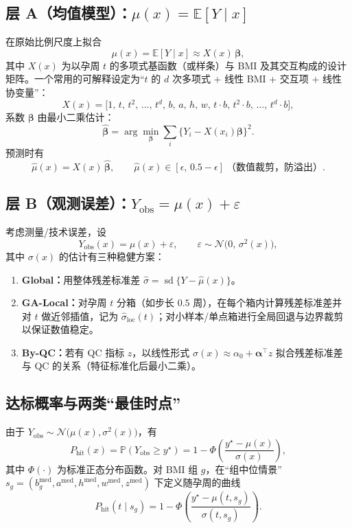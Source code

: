\documentclass[11pt,a4paper]{article}
\begin{document}
\subsection{层 A（均值模型）：$\mu(x)=\mathbb{E}[Y\mid x]$}
在原始比例尺度上拟合
\[
  \mu(x)=\mathbb{E}[Y\mid x]\approx X(x)\,\bm{\beta},
\]
其中 $X(x)$ 为以孕周 $t$ 的多项式基函数（或样条）与 BMI 及其交互构成的设计矩阵。一个常用的可解释设定为“$t$ 的 $d$ 次多项式 + 线性 BMI + 交互项 + 线性协变量”：
\[
  X(x)=\bigl[1,\, t,\, t^2,\,\dots,\,t^d,\, b,\, a,\, h,\, w,\, t\!\cdot\!b,\, t^2\!\cdot\!b,\,\dots,\,t^d\!\cdot\!b \bigr],
\]
系数 $\bm{\beta}$ 由最小二乘估计：
\[
  \widehat{\bm{\beta}}=\arg\min_{\bm{\beta}}\sum_i\bigl\{Y_i-X(x_i)\bm{\beta}\bigr\}^2.
\]
预测时有
\[
  \widehat{\mu}(x)=X(x)\,\widehat{\bm{\beta}},\qquad
  \widehat{\mu}(x)\in[\epsilon,\,0.5-\epsilon]\ \text{（数值裁剪，防溢出）}.
\]

\subsection{层 B（观测误差）：$Y_{\text{obs}}=\mu(x)+\varepsilon$}
考虑测量/技术误差，设
\[
  Y_{\text{obs}}(x)=\mu(x)+\varepsilon,\qquad
  \varepsilon\sim\mathcal{N}\bigl(0,\,\sigma^2(x)\bigr),
\]
其中 $\sigma(x)$ 的估计有三种稳健方案：
\begin{enumerate}
  \item \textbf{Global：}用整体残差标准差 $\hat\sigma=\operatorname{sd}\{Y-\widehat{\mu}(x)\}$。
  \item \textbf{GA-Local：}对孕周 $t$ 分箱（如步长 $0.5$ 周），在每个箱内计算残差标准差并对 $t$ 做近邻插值，记为 $\widehat{\sigma}_{\text{loc}}(t)$；对小样本/单点箱进行全局回退与边界裁剪以保证数值稳定。
  \item \textbf{By-QC：}若有 QC 指标 $z$，以线性形式
  \(
    \sigma(x)\approx \alpha_0+\bm{\alpha}^\top z
  \)
  拟合残差标准差与 QC 的关系（特征标准化后最小二乘）。
\end{enumerate}

\subsection{达标概率与两类“最佳时点”}
由于 $Y_{\text{obs}}\sim\mathcal{N}\bigl(\mu(x),\sigma^2(x)\bigr)$，有
\[
  P_{\text{hit}}(x)=\mathbb{P}(Y_{\text{obs}}\ge y^\star)
  =1-\Phi\!\left(\frac{y^\star-\mu(x)}{\sigma(x)}\right),
\]
其中 $\Phi(\cdot)$ 为标准正态分布函数。对 BMI 组 $g$，在“组中位情景”
\(
  s_g=(b^{\text{med}}_g,a^{\text{med}},h^{\text{med}},w^{\text{med}},z^{\text{med}})
\)
下定义随孕周的曲线
\[
  P_{\text{hit}}(t\mid s_g)=1-\Phi\!\left(\frac{y^\star-\mu(t,s_g)}{\sigma(t,s_g)}\right).
\]
\end{document}
